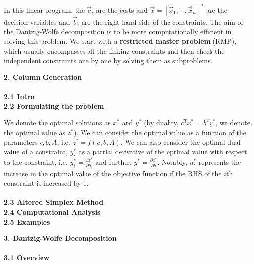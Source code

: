 \documentclass[11pt]{article}
\begin{document}
\noindent In this linear program, the $\vec{c}_i$ are the costs and $\vec{x} = [\vec{x}_1, \cdots, \vec{x}_n]^T$ are the decision variables and $\vec{b}_i$ are the right hand side of the constraints. The aim of the Dantzig-Wolfe decomposition is to be more computationally efficient in solving this problem. We start with a \textbf{restricted master problem} (RMP), which usually encompasses all the linking constraints and then check the independent constraints one by one by solving them as subproblems.

\newpage


\noindent \textbf{\large{2. Column Generation}} \\
\\

\noindent \textbf{2.1 Intro}
\\

\noindent \textbf{2.2 Formulating the problem}



\noindent We denote the optimal solutions as $x^*$ and $y^*$ (by duality, $c^T x^* = b^T y^*$, we denote the optimal value as $z^*$). We can consider the optimal value as a function of the parameters $c, b, A$, i.e. $z^* = f(c, b, A)$. We can also consider the optimal dual value of a constraint, $y^*_i$ as a partial derivative of the optimal value with respect to the constraint, i.e. $y^*_i = \frac{\partial z^*}{\partial b_i}$ and further, $y^* = \frac{\partial z^*}{\partial b}$. Notably, $u^*_i$ represents the increase in the optimal value of the objective function if the RHS of the $i$th constraint is increased by 1.
\\
\\

\noindent \textbf{2.3 Altered Simplex Method}
\\

\noindent \textbf{2.4 Computational Analysis}
\\

\noindent \textbf{2.5 Examples}
\\

\newpage

\noindent \textbf{\large{3. Dantzig-Wolfe Decomposition}} \\
\\

\noindent \textbf{3.1 Overview}
\\
\end{document}
